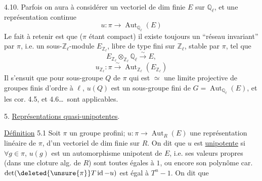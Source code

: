 4.10. Parfois on aura à considérer un vectoriel de dim finie $E$ sur $\mathbb Q_\ell$, et une représentation continue
\[
u:\pi\longrightarrow\operatorname{Aut}_{\mathbb Q_\ell}(E)
\tag*{(4.10.1)}
\]
Le fait à retenir est que ($\pi$ étant compact) il existe toujours un ``réseau invariant'' par $\pi$, i.e. un sous-$\mathbb Z_\ell$-module $E_{\mathbb Z_\ell}$,  libre de type fini sur $\mathbb Z_\ell$, stable par $\pi$, tel que
\[
E_{\mathbb Z_\ell}\otimes_{\mathbb Z_\ell}\mathbb Q_\ell\xrightarrow{\sim}E,
\]
\[
u_{\mathbb Z_\ell}:\pi\xrightarrow{\sim}\operatorname{Aut}_{\mathbb Z_\ell}(E_{\mathbb Z_\ell})
\tag*{(4.10.2)}
\]
Il s'ensuit  que pour  sous-groupe $Q$ de $\pi$ qui est $\simeq$ une limite projective de groupes finis d'ordre  à $\ell$, $u(Q)$ est un sous-groupe fini de $G=\operatorname{Aut}_{\mathbb Q_\ell}(E)$, et les cor. 4.5, et 4.6\ldots\ sont applicables.

5. \uline{Représentations quasi-unipotentes}.

\uline{Définition} 5.1 Soit $\pi$ un groupe profini; $u:\pi\longrightarrow\operatorname{Aut}_R(E)$ une représentation linéaire de $\pi$,   d'un vectoriel de dim finie sur  $R$. On dit que $u$ est  \uline{unipotente} si $\forall g\in\pi$, $u(g)$ est un automorphisme unipotent de $E$, i.e. ses valeurs propres (dans une cloture alg. de $R$) sont toutes égales à $1$, ou encore son polynôme car. $\det(\deleted{\unsure{\pi}}T\operatorname{id}-u)$ est égal à $T^n-1$. On dit que
